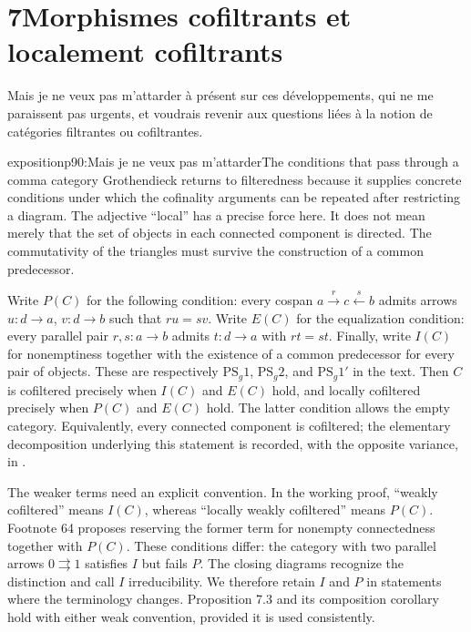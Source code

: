 \section*{7\quad Morphismes cofiltrants et localement cofiltrants}

Mais je ne veux pas m'attarder à présent sur ces développements, qui ne me paraissent pas urgents, et voudrais revenir aux questions liées à la notion de catégories filtrantes ou cofiltrantes.

\begin{dcomment}{exposition}{p90:Mais je ne veux pas m'attarder}{The conditions that pass through a comma category}
Grothendieck returns to filteredness because it supplies concrete conditions under which the cofinality arguments can be repeated after restricting a diagram. The adjective ``local'' has a precise force here. It does not mean merely that the set of objects in each connected component is directed. The commutativity of the triangles must survive the construction of a common predecessor.

Write $P(C)$ for the following condition: every cospan $a\xrightarrow{r}c\xleftarrow{s}b$ admits arrows $u:d\to a$, $v:d\to b$ such that $ru=sv$. Write $E(C)$ for the equalization condition: every parallel pair $r,s:a\to b$ admits $t:d\to a$ with $rt=st$. Finally, write $I(C)$ for nonemptiness together with the existence of a common predecessor for every pair of objects. These are respectively $\mathrm{PS}_g1$, $\mathrm{PS}_g2$, and $\mathrm{PS}_g1'$ in the text. Then $C$ is cofiltered precisely when $I(C)$ and $E(C)$ hold, and locally cofiltered precisely when $P(C)$ and $E(C)$ hold. The latter condition allows the empty category. Equivalently, every connected component is cofiltered; the elementary decomposition underlying this statement is recorded, with the opposite variance, in \citet[Lemmas 4.19.6 and 4.19.8]{StacksFiltered2026}.

The weaker terms need an explicit convention. In the working proof, ``weakly cofiltered'' means $I(C)$, whereas ``locally weakly cofiltered'' means $P(C)$. Footnote 64 proposes reserving the former term for nonempty connectedness together with $P(C)$. These conditions differ: the category with two parallel arrows $0\rightrightarrows1$ satisfies $I$ but fails $P$. The closing diagrams recognize the distinction and call $I$ irreducibility. We therefore retain $I$ and $P$ in statements where the terminology changes. Proposition 7.3 and its composition corollary hold with either weak convention, provided it is used consistently.


\end{dcomment}
